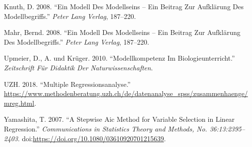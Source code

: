 \documentclass[]{article}
\begin{document}
\hypertarget{ref-Knuth}{}
Knuth, D. 2008. ``Ein Modell Des Modellseins -- Ein Beitrag Zur
Aufklärung Des Modellbegriffs.'' \emph{Peter Lang Verlag}, 187--220.

\hypertarget{ref-Mahr-Bernd-2008}{}
Mahr, Bernd. 2008. ``Ein Modell Des Modellseins -- Ein Beitrag Zur
Aufklärung Des Modellbegriffs.'' \emph{Peter Lang Verlag}, 187--220.

\hypertarget{ref-Upmeier-Krueger-2010}{}
Upmeier, D., A. und Krüger. 2010. ``Modellkompetenz Im
Biologieunterricht.'' \emph{Zeitschrift Für Didaktik Der
Naturwissenschaften}.

\hypertarget{ref-UZH}{}
UZH. 2018. ``Multiple Regressionsanalyse.''
\url{https://www.methodenberatung.uzh.ch/de/datenanalyse_spss/zusammenhaenge/mreg.html}.

\hypertarget{ref-Yamashita}{}
Yamashita, T. 2007. ``A Stepwise Aic Method for Variable Selection in
Linear Regression.'' \emph{Communications in Statistics Theory and
Methods, No. 36:13:2395--2403}.
doi:\href{https://doi.org/https://doi.org/10.1080/03610920701215639}{https://doi.org/10.1080/03610920701215639}.
\end{document}
